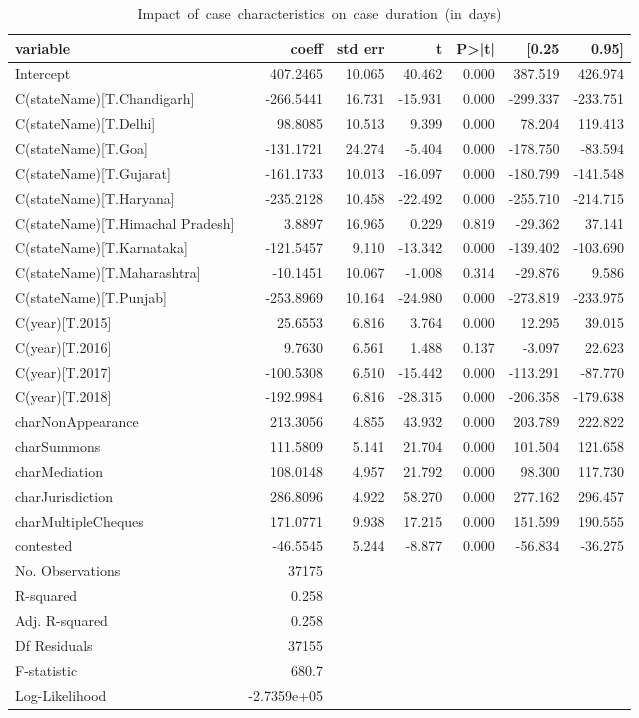 {\footnotesize
  \begin{longtable}{@{}lrrrrrr@{}}
\caption{\mbox{Impact of case characteristics on case duration (in days)}}
\label{tab:duration_reg}\\
\toprule
variable & coeff & std err & t & P>|t| & [0.25 & 0.95] \\\midrule
\endhead
Intercept & 407.2465 & 10.065 & 40.462 & 0.000 & 387.519 & 426.974 \\
C(stateName)[T.Chandigarh] & -266.5441 & 16.731 & -15.931 & 0.000 & -299.337 & -233.751 \\
C(stateName)[T.Delhi] & 98.8085 & 10.513 & 9.399 & 0.000 & 78.204 & 119.413 \\
C(stateName)[T.Goa] & -131.1721 & 24.274 & -5.404 & 0.000 & -178.750 & -83.594 \\
C(stateName)[T.Gujarat] & -161.1733 & 10.013 & -16.097 & 0.000 & -180.799 & -141.548 \\
C(stateName)[T.Haryana] & -235.2128 & 10.458 & -22.492 & 0.000 & -255.710 & -214.715 \\
C(stateName)[T.Himachal Pradesh] & 3.8897 & 16.965 & 0.229 & 0.819 & -29.362 & 37.141 \\
C(stateName)[T.Karnataka] & -121.5457 & 9.110 & -13.342 & 0.000 & -139.402 & -103.690 \\
C(stateName)[T.Maharashtra] & -10.1451 & 10.067 & -1.008 & 0.314 & -29.876 & 9.586 \\
C(stateName)[T.Punjab] & -253.8969 & 10.164 & -24.980 & 0.000 & -273.819 & -233.975 \\
C(year)[T.2015] & 25.6553 & 6.816 & 3.764 & 0.000 & 12.295 & 39.015 \\
C(year)[T.2016] & 9.7630 & 6.561 & 1.488 & 0.137 & -3.097 & 22.623 \\
C(year)[T.2017] & -100.5308 & 6.510 & -15.442 & 0.000 & -113.291 & -87.770 \\
C(year)[T.2018] & -192.9984 & 6.816 & -28.315 & 0.000 & -206.358 & -179.638 \\
charNonAppearance & 213.3056 & 4.855 & 43.932 & 0.000 & 203.789 & 222.822 \\
charSummons & 111.5809 & 5.141 & 21.704 & 0.000 & 101.504 & 121.658 \\
charMediation & 108.0148 & 4.957 & 21.792 & 0.000 & 98.300 & 117.730 \\
charJurisdiction & 286.8096 & 4.922 & 58.270 & 0.000 & 277.162 & 296.457 \\
charMultipleCheques & 171.0771 & 9.938 & 17.215 & 0.000 & 151.599 & 190.555 \\
contested & -46.5545 & 5.244 & -8.877 & 0.000 & -56.834 & -36.275\\
\bottomrule
No. Observations & 37175 & & & & &\\
R-squared & 0.258 & & & & & \\
Adj. R-squared& 0.258& & & & & \\
Df Residuals& 37155 & & & & &\\
F-statistic & 680.7 & & & & & \\
Log-Likelihood & -2.7359e+05 & & & & & \\
\bottomrule
\end{longtable}}

